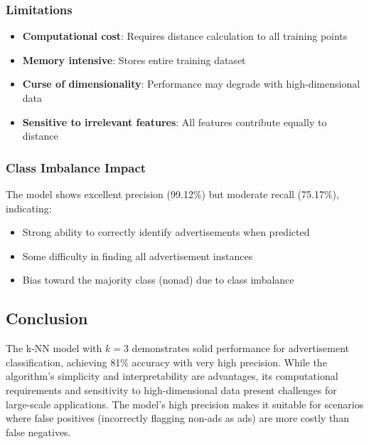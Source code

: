 \subsubsection{Limitations}
\begin{itemize}
    \item \textbf{Computational cost}: Requires distance calculation to all training points
    \item \textbf{Memory intensive}: Stores entire training dataset
    \item \textbf{Curse of dimensionality}: Performance may degrade with high-dimensional data
    \item \textbf{Sensitive to irrelevant features}: All features contribute equally to distance
\end{itemize}

\subsubsection{Class Imbalance Impact}
The model shows excellent precision (99.12\%) but moderate recall (75.17\%), indicating:
\begin{itemize}
    \item Strong ability to correctly identify advertisements when predicted
    \item Some difficulty in finding all advertisement instances
    \item Bias toward the majority class (nonad) due to class imbalance
\end{itemize}

\subsection{Conclusion}
The k-NN model with $k = 3$ demonstrates solid performance for advertisement classification, achieving 81\% accuracy with very high precision. While the algorithm's simplicity and interpretability are advantages, its computational requirements and sensitivity to high-dimensional data present challenges for large-scale applications. The model's high precision makes it suitable for scenarios where false positives (incorrectly flagging non-ads as ads) are more costly than false negatives.